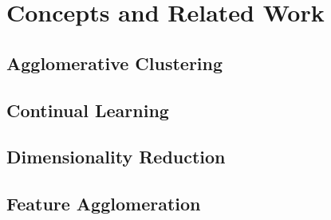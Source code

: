 

\section{Concepts and Related Work}
\label{sec:background}

\subsection{Agglomerative Clustering}
\label{subsec:agglomeration}

\subsection{Continual Learning}
\label{subsec:contingual}

\subsection{Dimensionality Reduction}
\label{subsec:dimreduce}

\subsection{Feature Agglomeration}
\label{subsec:featagg}


